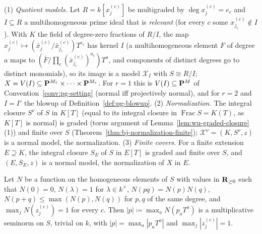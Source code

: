 \begin{remark}[Examples]\label{rmk:gl-model-examples}
\leanok
{}
(1) \emph{Quotient models.} Let $R=k[x^{(c)}_j]$ be multigraded by $\deg x^{(c)}_j=e_c$ and $I\subseteq R$ a multihomogeneous
prime ideal that is \emph{relevant} (for every $c$ some $x^{(c)}_{j_c}\notin I$). With $K$ the field of degree-zero fractions
of $R/I$, the map $x^{(c)}_j\mapsto(\bar x^{(c)}_j/\bar x^{(c)}_{j_c})T^{e_c}$ has kernel $I$ (a multihomogeneous element
$F$ of degree $a$ maps to $(\bar F/\prod_c(\bar x^{(c)}_{j_c})^{a_c})T^a$, and components of distinct degrees go to distinct
monomials), so its image is a model $\mathcal X_I$ with $S\cong R/I$; $X=V(I)\subseteq\mathbf{P}^{M_1}\times\dots\times\mathbf{P}^{M_r}$. For
$r=1$ this is $V(I)\subseteq\mathbf{P}^M$ of Convention~\ref{conv:pg-setting} (normal iff projectively normal), and for $r=2$ and
$I=I'$ the blowup of Definition~\ref{def:pg-blowup}.
(2) \emph{Normalization.} The integral closure $S^\nu$ of $S$ in $K[T]$ (equal to its integral closure in
$\operatorname{Frac}S=K(T)$, as $K[T]$ is normal) is graded (torus argument of Lemma~\ref{lem:wu-graded-closure}(1)) and finite over
$S$ (Theorem~\ref{thm:bj-normalization-finite}); $\mathcal X^\nu=(K,S^\nu,z)$ is a normal model, the normalization.
(3) \emph{Finite covers.} For a finite extension $E\supseteq K$, the integral closure $S_E$ of $S$ in $E[T]$ is graded and
finite over $S$, and $(E,S_E,z)$ is a normal model, the normalization of $X$ in $E$.
\end{remark}

\begin{lemma}\label{lem:gl-multigraded-extension}
\leanok
{}
Let $N$ be a function on the homogeneous elements of $S$ with values in $\mathbf{R}_{\ge0}$ such that $N(0)=0$, $N(\lambda)=1$ for
$\lambda\in k^\times$, $N(pq)=N(p)N(q)$, $N(p+q)\le\max(N(p),N(q))$ for $p,q$ of the same degree, and $\max_jN(z^{(c)}_j)=1$
for every $c$. Then $|p|\coloneqq\max_aN(p_aT^a)$ is a multiplicative seminorm on $S$, trivial on $k$, with
$|p|=\max_a|p_aT^a|$ and $\max_j|z^{(c)}_j|=1$.
\end{lemma}

